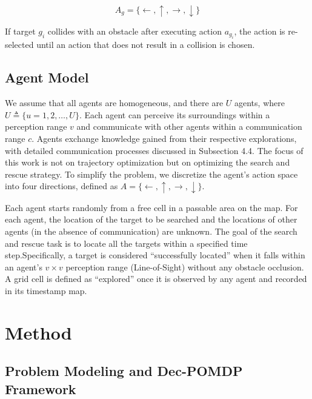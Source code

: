 \documentclass[lettersize,journal]{IEEEtran}
\begin{document}
\begin{equation}
A_g = \{ \leftarrow, \uparrow, \rightarrow, \downarrow \}
\end{equation}

If target \( g_i \) collides with an obstacle after executing action \( a_{g_i} \), the action is re-selected until an action that does not result in a collision is chosen.
\subsection{Agent Model}

We assume that all agents are homogeneous, and there are \( U \) agents, where \( U \triangleq \{u = 1, 2, \dots, U\} \). Each agent can perceive its surroundings within a perception range \( v \) and communicate with other agents within a communication range \( c \). Agents exchange knowledge gained from their respective explorations, with detailed communication processes discussed in Subsection 4.4. The focus of this work is not on trajectory optimization but on optimizing the search and rescue strategy. To simplify the problem, we discretize the agent's action space into four directions, defined as \( A = \{ \leftarrow, \uparrow, \rightarrow, \downarrow \} \).

Each agent starts randomly from a free cell in a passable area on the map. For each agent, the location of the target to be searched and the locations of other agents (in the absence of communication) are unknown. The goal of the search and rescue task is to locate all the targets within a specified time step.Specifically, a target is considered ``successfully located'' when it falls within an agent's $v \times v$ perception range (Line-of-Sight) without any obstacle occlusion. A grid cell is defined as ``explored'' once it is observed by any agent and recorded in its timestamp map.

\section{Method}
\subsection{Problem Modeling and Dec-POMDP Framework}
\end{document}
